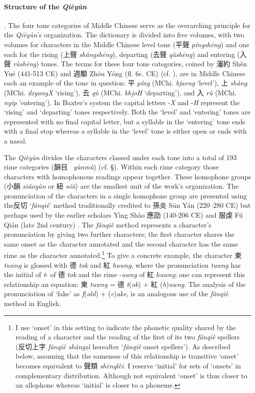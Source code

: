 \paragraph{Structure of the \emph{Qièyùn}}.
The four tone categories of Middle Chinese serve as the overarching
principle for the  \emph{Qièyùn}'s organization. The dictionary is
divided into five volumes, with two volumes for characters in the Middle
Chinese level tone (平聲  \emph{píngshēng}) and one each for the rising
(上聲  \emph{shǎngshēng}), departing (去聲  \emph{qùshēng}) and entering
(入聲  \emph{rùshēng}) tones. The terms for these four tone categories,
coined by 瀋約 Shěn Yuē (441-513 CE) and 週顒 Zhōu Yóng (fl. 6c. CE)
(cf. \cite[304]{Baxter1992}), are in Middle Chinese each an example of the
tone in question: 平  \emph{píng} (MChi.  \emph{bjaeng} `level'), 上
 \emph{shàng} (MChi.  \emph{dzyangX} `rising'), 去  \emph{qù} (MChi.
 \emph{khjoH} `de­part­ing'), and 入  \emph{rù} (MChi.  \emph{nyip}
'entering'). In Baxter's system the capital letters -\emph{X} and
-\emph{H} represent the `rising' and `departing' tones respectively.
Both the `level' and `entering' tones are re­pre­sented with no final
capital letter, but a syllable in the `entering' tone ends with a final
stop whereas a syllable in the `level' tone is either open or ends with
a nasal.

The  \emph{Qièyùn} divides the characters classed under each tone into a
total of 193 rime categories (韻目~ \emph{yùnmù}) (cf. §). Within each
rime category those characters with homophonous readings appear
together. These homophone groups (小韻  \emph{xiǎoyùn} or 紐  \emph{niǔ})
are the smallest unit of the work's organization. The pronunciation
of the characters in a single homophone group are presented using
the反切 `\emph{fǎnqiè}' method traditionally credited to 孫炎 Sūn Yán
(220--280 CE) but perhaps used by the earlier scholars Yìng Shào 應劭
(140-206 CE) and 服虔 Fú Qián (late 2nd century) 
\citep[38]{Branner2000c}. The
 \emph{fǎnqiè} method represents a character's pronunciation by
giving two further characters; the first character shares the same onset
as the character annotated and the second character has the same rime as
the character annotated.\footnote{I use `onset' in this setting to
  indicate the phonetic quality shared by the reading of a character and
  the reading of the first of its two  \emph{fǎnqiè }spellers (反切上字
   \emph{fǎnqiè shǎngzì} hereafter `\emph{fǎnqiè} onset spellers'). As
  described below, assuming that the sameness of this relationship is
  transitive `onset' becomes equivalent to 聲類  \emph{shēnglèi}. I
  reserve `initial' for sets of `onsets' in complementary distribution.
  Although not equivalent `onset' is thus closer to an allophone whereas
  `initial' is closer to a phoneme.} To give a concrete example, the
character 東  \emph{tuwng} is glossed with 德 \emph{tok} and 紅
 \emph{huwng}, where the pro­nun­ci­a­tion \emph{tuwng} has the initial
of \emph{t}- of 德  \emph{tok} and the rime -\emph{uwng} of 紅
 \emph{huwng}; one can represent this relationship an equation: 東
 \emph{tuwng} = 德 \emph{t}(\emph{ok}) + 紅 (\emph{h})\emph{uwng}. The
analysis of the pro­nun­ci­a­tion of `fake' as \emph{f}(\emph{old}) +
(\emph{c})\emph{ake}, is an analogous use of the  \emph{fǎnqiè} method in
English.

